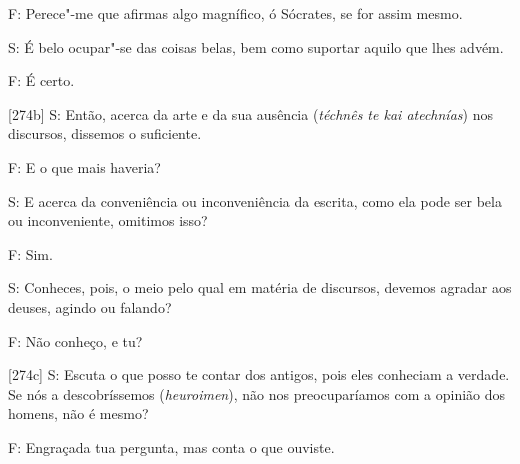  

F: Perece"-me que afirmas algo magnífico, ó Sócrates, se for assim mesmo.

 

S: É belo ocupar"-se das coisas belas, bem como suportar aquilo que lhes
advém.

 

F: É certo.

 

[274b] S: Então, acerca da arte e da sua ausência (\emph{téchnês te
kai atechnías}) nos discursos, dissemos o suficiente.

 

F: E o que mais haveria?

 

S: E acerca da conveniência ou inconveniência da escrita, como ela pode
ser bela ou inconveniente, omitimos isso?

 

F: Sim.

 

S: Conheces, pois, o meio pelo qual em matéria de discursos, devemos
agradar aos deuses, agindo ou falando?

 

F: Não conheço, e tu?

 

[274c] S: Escuta o que posso te contar dos antigos, pois eles
conheciam a verdade. Se nós a descobríssemos (\emph{heuroimen}), não nos
preocuparíamos com a opinião dos homens, não é mesmo?

 

F: Engraçada tua pergunta, mas conta o que ouviste.

 

